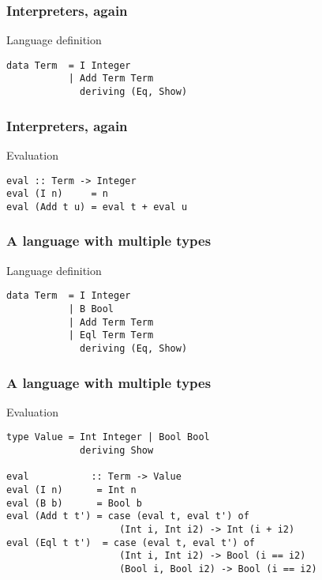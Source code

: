 \documentclass[pdftex,aspectratio=169]{beamer}
\author[Gabriel Radanne]{Dr. Gabriel Radanne}
\subtitle
{GADT: Generalized Algebraic DataType}
\begin{document}
\begin{frame}
  \titlepage
\end{frame}

\begin{frame}[fragile]
  \frametitle{Interpreters, again}
  \begin{block}{Language definition}
    \begin{lstlisting}
data Term  = I Integer
           | Add Term Term
             deriving (Eq, Show)
  \end{lstlisting}
\end{block}
\end{frame}

\begin{frame}[fragile]
  \frametitle{Interpreters, again}
  \begin{block}{Evaluation}
    \begin{lstlisting}
eval :: Term -> Integer
eval (I n)     = n
eval (Add t u) = eval t + eval u
  \end{lstlisting}
\end{block}
\end{frame}


\begin{frame}[fragile]
  \frametitle{A language with multiple types}
  \begin{block}{Language definition}
    \begin{lstlisting}
data Term  = I Integer
           | B Bool
           | Add Term Term
           | Eql Term Term
             deriving (Eq, Show)
  \end{lstlisting}
\end{block}
\end{frame}

\begin{frame}[fragile]
  \frametitle{A language with multiple types}
  \begin{block}{Evaluation}
    \begin{lstlisting}
type Value = Int Integer | Bool Bool
             deriving Show
      
eval           :: Term -> Value
eval (I n)      = Int n
eval (B b)      = Bool b
eval (Add t t') = case (eval t, eval t') of
                    (Int i, Int i2) -> Int (i + i2)
eval (Eql t t')  = case (eval t, eval t') of
                    (Int i, Int i2) -> Bool (i == i2)
                    (Bool i, Bool i2) -> Bool (i == i2)
  \end{lstlisting}
\end{block}
\end{frame}
\end{document}
